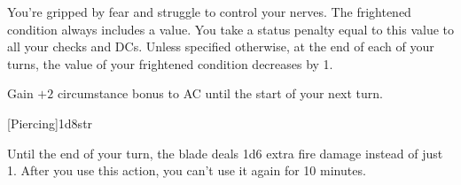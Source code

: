 \documentclass[paper=63mm:88mm, DIV=21, fontsize=7.5pt]{scrartcl}
\begin{document}
You're gripped by fear and struggle to control your nerves.
The frightened condition always includes a value.
You take a status penalty equal to this value to all your checks and DCs.
Unless specified otherwise, at the end of each of your turns, the value of your frightened condition decreases by 1.






Gain \(+2\) circumstance bonus to AC until the start of your next turn.









[Piercing]{1d8}{str}



Until the end of your turn, the blade deals 1d6 extra fire damage instead of just 1. After you use this action, you can't use it again for 10 minutes.

\vfill

\end{document}
